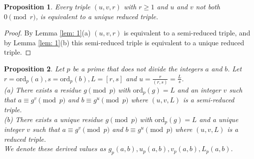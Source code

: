 \documentclass[12pt, a4paper,  reqno, english]{amsart}%
\numberwithin{equation}{section}
\newtheorem{proposition}{Proposition}
\theoremstyle{definition}
\renewcommand{\geq}{\geqslant}
\begin{document}
 \begin{proposition} \label{Prop from Lemma 1} Every triple $(u,v,r)$ with $r\geq 1$ and $u$ and $v$ not both $0 \pmod r$, is equivalent to a unique reduced triple.
 \end{proposition}  

 \begin{proof}  
By Lemma \ref{lem: 1}(a) $(u,v,r)$ is equivalent to a semi-reduced triple, and by Lemma \ref{lem: 1}(b) this semi-reduced triple is equivalent to a unique reduced triple.
 \end{proof}

\begin{proposition} \label{Prop Generators} Let $p$ be a prime that does not divide the integers $a$ and $b$. Let $r=\text{ord}_p(a), s=\text{ord}_p(b), L=[r,s]$  and  $u=\frac r{(r,s)}=\frac Ls$.\\
(a) There exists a residue $g\pmod p$ with $\text{ord}_p(g)=L$ and an integer $v$
such that $a\equiv g^{v} \pmod p$ and $b\equiv g^{u} \pmod p$ where $(u,v,L)$ is a semi-reduced triple.\\
(b) There exists a unique residue $g\pmod p$ with $\text{ord}_p(g)=L$  and a unique integer $v$
such that $a\equiv g^{v} \pmod p$ and $b\equiv g^{u} \pmod p$ where $(u,v,L)$ is a reduced triple.\\
We denote these derived values as $g_p(a,b), u_p(a,b), v_p(a,b), L_p(a,b)$.
\end{proposition} 
\end{document}
